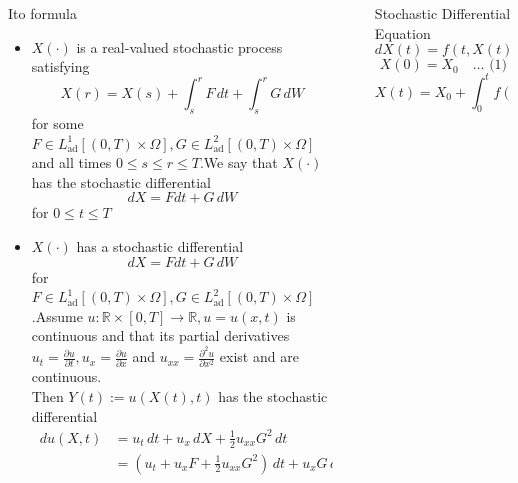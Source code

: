 \documentclass[final]{beamer}
\newlength{\sepwidth}
\newlength{\colwidth}
\newcommand{\separatorcolumn}{\begin{column}{\sepwidth}\end{column}}
\begin{document}
\begin{frame}[t]
\begin{columns}[t]
\begin{column}{\colwidth}
\begin{block}{It$\hat{\text{o}}$ formula}
 \begin{itemize}
     \item $X(\cdot)$ is a real-valued stochastic process satisfying \[ X(r) = X(s) + \int_s^r F\,dt + \int_s^r G\,dW\] for some $F \in L^1_\text{ad}[(0,T)\times \Omega], G \in L^2_\text{ad}[(0,T)\times \Omega]$ and all times $0 \leq  s \leq r \leq T$.We say that $X(\cdot)$ has the stochastic differential 
     \[ dX = F dt + G\,dW\] for $0 \leq t \leq T$
     \item $X(\cdot)$ has a stochastic differential \[ dX = F dt + G\,dW\] for $F \in L^1_\text{ad}[(0,T)\times \Omega], G \in L^2_\text{ad}[(0,T)\times \Omega]$.Assume $u \colon \mathbb{R} \times [0,T] \rightarrow \mathbb{R}, u = u(x,t)$ is continuous and that its partial derivatives $u_t = \frac{\partial u}{\partial t}, u_x = \frac{\partial u}{\partial x}$ and $u_{xx} = \frac{\partial^2 u}{\partial x^2}$  exist and are continuous.\\
     Then $Y(t) := u(X(t),t)$ has the stochastic differential 
     \begin{align*}
         \,du(X,t) &= u_t\,dt + u_x\,dX + \frac{1}{2} u_{xx} G^2\,dt\\
         &= (u_t + u_x F + \frac{1}{2} u_{xx} G^2)\,dt + u_x G\,dW
     \end{align*}
 \end{itemize}





    
\end{block}




\end{column}

\separatorcolumn

\begin{column}{\colwidth}

  \begin{block}{Stochastic Differential Equation}
    \[dX(t) = f(t,X(t))\,dt + \sigma(t,X(t))\,dW_t, \quad t \in (0,T) \]  \[X(0) = X_0 \quad  \dots \text{ (1)} \] 
    \[X(t) = X_0 + \int_0^t f(s,X(s))\,ds + \int_0^t \sigma(s,X(s))\,dW_s \quad \text{almost surely in} \ P.\]
    

\end{block}
\end{column}
\end{columns}
\end{frame}
\end{document}
